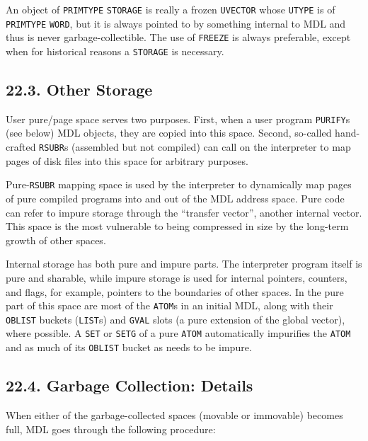 \documentclass[a4paper,]{article}
\begin{document}
An object of \texttt{PRIMTYPE} \texttt{STORAGE} is really a frozen \texttt{UVECTOR} whose
\texttt{UTYPE} is of \texttt{PRIMTYPE} \texttt{WORD}, but it is always pointed to by something internal to MDL and thus is
never garbage-collectible. The use of \texttt{FREEZE} is always preferable, except when for historical reasons a
\texttt{STORAGE} is necessary.

\subsection{22.3. Other Storage}\label{other-storage}

User pure/page space serves two purposes. First, when a user program \texttt{PURIFY}s (see below)
MDL objects, they are copied into this space. Second, so-called hand-crafted \texttt{RSUBR}s
(assembled but not compiled) can call on the interpreter to map pages of disk files into this space for arbitrary purposes.

Pure-\texttt{RSUBR} mapping space is used by the interpreter to dynamically map pages of pure compiled programs into and
out of the MDL address space. Pure code can refer to impure storage through the ``transfer vector'', another internal
vector. This space is the most vulnerable to being compressed in size by the long-term growth of other spaces.

Internal storage has both pure and impure parts. The interpreter program itself is pure and sharable, while impure storage
is used for internal pointers, counters, and flags, for example, pointers to the boundaries of other spaces. In the pure
part of this space are most of the \texttt{ATOM}s in an initial MDL, along with their
\texttt{OBLIST} buckets (\texttt{LIST}s) and \texttt{GVAL} slots (a pure
extension of the global vector), where possible. A \texttt{SET} or \texttt{SETG}
of a pure \texttt{ATOM} automatically impurifies the \texttt{ATOM} and as much of its \texttt{OBLIST} bucket as needs to be
impure.

\subsection{22.4. Garbage Collection: Details}\label{garbage-collection-details}

When either of the garbage-collected spaces (movable or immovable) becomes full, MDL goes through the following procedure:
\end{document}
